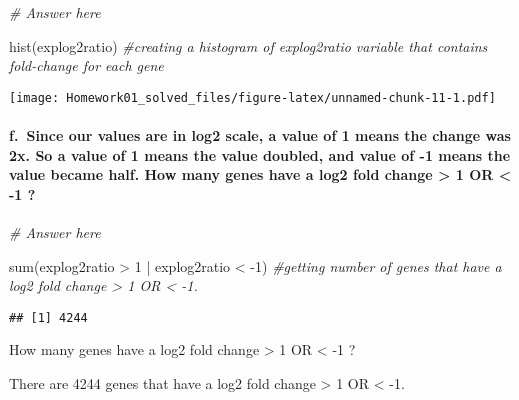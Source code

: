 \documentclass[
]{article}
\newenvironment{Shaded}{\begin{snugshade}}{\end{snugshade}}
\newcommand{\CommentTok}[1]{\textcolor[rgb]{0.56,0.35,0.01}{\textit{#1}}}
\newcommand{\DecValTok}[1]{\textcolor[rgb]{0.00,0.00,0.81}{#1}}
\newcommand{\FunctionTok}[1]{\textcolor[rgb]{0.00,0.00,0.00}{#1}}
\newcommand{\NormalTok}[1]{#1}
\newcommand{\SpecialCharTok}[1]{\textcolor[rgb]{0.00,0.00,0.00}{#1}}
\begin{document}
\begin{Shaded}
\begin{Highlighting}[]
\CommentTok{\# Answer here}

\FunctionTok{hist}\NormalTok{(explog2ratio) }\CommentTok{\#creating a histogram of explog2ratio variable that contains fold{-}change for each gene}
\end{Highlighting}
\end{Shaded}

\texttt{[image: Homework01\_solved\_files/figure-latex/unnamed-chunk-11-1.pdf]}

\hypertarget{f.-since-our-values-are-in-log2-scale-a-value-of-1-means-the-change-was-2x.-so-a-value-of-1-means-the-value-doubled-and-value-of--1-means-the-value-became-half.-how-many-genes-have-a-log2-fold-change-1-or--1}{%
\paragraph{f.~Since our values are in log2 scale, a value of 1 means the
change was 2x. So a value of 1 means the value doubled, and value of -1
means the value became half. How many genes have a log2 fold change
\textgreater{} 1 OR \textless{} -1
?}\label{f.-since-our-values-are-in-log2-scale-a-value-of-1-means-the-change-was-2x.-so-a-value-of-1-means-the-value-doubled-and-value-of--1-means-the-value-became-half.-how-many-genes-have-a-log2-fold-change-1-or--1}}

\begin{Shaded}
\begin{Highlighting}[]
\CommentTok{\# Answer here}

\FunctionTok{sum}\NormalTok{(explog2ratio }\SpecialCharTok{\textgreater{}} \DecValTok{1} \SpecialCharTok{|}\NormalTok{ explog2ratio }\SpecialCharTok{\textless{}} \SpecialCharTok{{-}}\DecValTok{1}\NormalTok{) }\CommentTok{\#getting number of genes that have a log2 fold change \textgreater{} 1 OR \textless{} {-}1.}
\end{Highlighting}
\end{Shaded}

\begin{verbatim}
## [1] 4244
\end{verbatim}

How many genes have a log2 fold change \textgreater{} 1 OR \textless{}
-1 ?

There are 4244 genes that have a log2 fold change \textgreater{} 1 OR
\textless{} -1.
\end{document}

